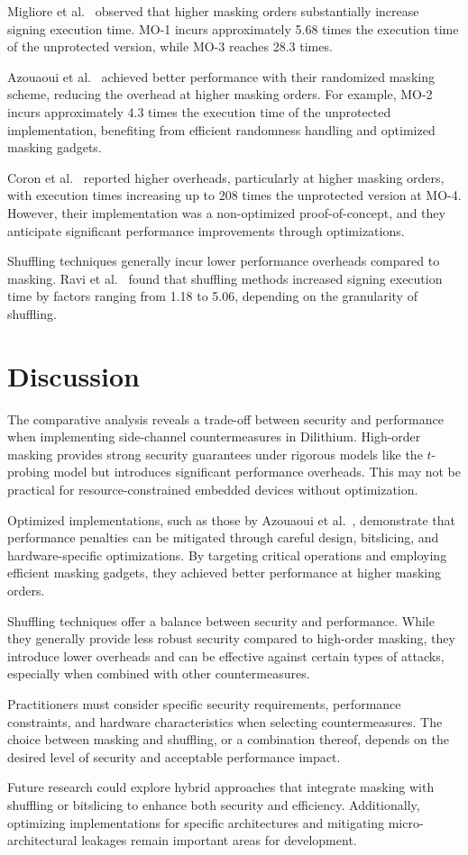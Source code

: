 Migliore et al.~\cite{Migliore19} observed that higher masking orders substantially increase signing execution time. MO-1 incurs approximately 5.68 times the execution time of the unprotected version, while MO-3 reaches 28.3 times.

Azouaoui et al.~\cite{Azouaoui22} achieved better performance with their randomized masking scheme, reducing the overhead at higher masking orders. For example, MO-2 incurs approximately 4.3 times the execution time of the unprotected implementation, benefiting from efficient randomness handling and optimized masking gadgets.

Coron et al.~\cite{Coron23} reported higher overheads, particularly at higher masking orders, with execution times increasing up to 208 times the unprotected version at MO-4. However, their implementation was a non-optimized proof-of-concept, and they anticipate significant performance improvements through optimizations.

Shuffling techniques generally incur lower performance overheads compared to masking. Ravi et al.~\cite{Ravi20} found that shuffling methods increased signing execution time by factors ranging from 1.18 to 5.06, depending on the granularity of shuffling.

\section{Discussion}

The comparative analysis reveals a trade-off between security and performance when implementing side-channel countermeasures in Dilithium. High-order masking provides strong security guarantees under rigorous models like the $t$-probing model but introduces significant performance overheads. This may not be practical for resource-constrained embedded devices without optimization.

Optimized implementations, such as those by Azouaoui et al.~\cite{Azouaoui22}, demonstrate that performance penalties can be mitigated through careful design, bitslicing, and hardware-specific optimizations. By targeting critical operations and employing efficient masking gadgets, they achieved better performance at higher masking orders.

Shuffling techniques offer a balance between security and performance. While they generally provide less robust security compared to high-order masking, they introduce lower overheads and can be effective against certain types of attacks, especially when combined with other countermeasures.

Practitioners must consider specific security requirements, performance constraints, and hardware characteristics when selecting countermeasures. The choice between masking and shuffling, or a combination thereof, depends on the desired level of security and acceptable performance impact.

Future research could explore hybrid approaches that integrate masking with shuffling or bitslicing to enhance both security and efficiency. Additionally, optimizing implementations for specific architectures and mitigating micro-architectural leakages remain important areas for development.

